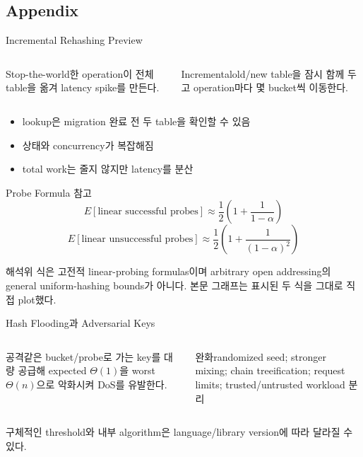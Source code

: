 \subsection{Appendix}
\begin{frame}{Incremental Rehashing Preview}
\begin{columns}[T]
\begin{alertblock}{Stop-the-world}한 operation이 전체 table을 옮겨 latency spike를 만든다.\end{alertblock}
\begin{block}{Incremental}old/new table을 잠시 함께 두고 operation마다 몇 bucket씩 이동한다.\end{block}
\end{columns}
\begin{itemize}\item lookup은 migration 완료 전 두 table을 확인할 수 있음\item 상태와 concurrency가 복잡해짐\item total work는 줄지 않지만 latency를 분산\end{itemize}
\end{frame}
\begin{frame}{Probe Formula 참고}
\[
E[\text{linear successful probes}]
\approx\frac12\left(1+\frac1{1-\alpha}\right)
\]
\[
E[\text{linear unsuccessful probes}]
\approx\frac12\left(1+\frac1{(1-\alpha)^2}\right)
\]
\begin{alertblock}{해석}위 식은 고전적 linear-probing formulas이며 arbitrary open addressing의 general uniform-hashing bounds가 아니다. 본문 그래프는 표시된 두 식을 그대로 직접 plot했다.\end{alertblock}
\end{frame}
\begin{frame}{Hash Flooding과 Adversarial Keys}
\begin{columns}[T]
\begin{alertblock}{공격}같은 bucket/probe로 가는 key를 대량 공급해 expected $\Theta(1)$을 worst $\Theta(n)$으로 악화시켜 DoS를 유발한다.\end{alertblock}
\begin{block}{완화}randomized seed; stronger mixing; chain treeification; request limits; trusted/untrusted workload 분리\end{block}
\end{columns}
\begin{center}\small 구체적인 threshold와 내부 algorithm은 language/library version에 따라 달라질 수 있다.\end{center}
\end{frame}
